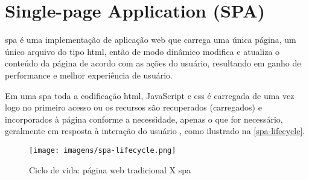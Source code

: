 \section{Single-page Application (SPA)}
\Gls{spa} é uma implementação de aplicação web que carrega uma única página, um único arquivo do tipo \ac{html}, então de modo dinâmico modifica e atualiza o conteúdo da página de acordo com as ações do usuário, resultando em ganho de performance e melhor experiência de usuário. \cite{spamozilla}

Em uma \ac{spa} toda a codificação \ac{html}, JavaScript e \acs{css} é carregada de uma vez logo no primeiro acesso ou os recursos são recuperados (carregados) e incorporados à página conforme a necessidade, apenas o que for necessário, geralmente em resposta à interação do usuário \cite{wikispa}, como ilustrado na \autoref{spa-lifecycle}.

\begin{figure}[H]
	\centering
	\caption{\label{spa-lifecycle}Ciclo de vida: página web tradicional X \acs{spa}}
	\texttt{[image: imagens/spa-lifecycle.png]}
\end{figure}